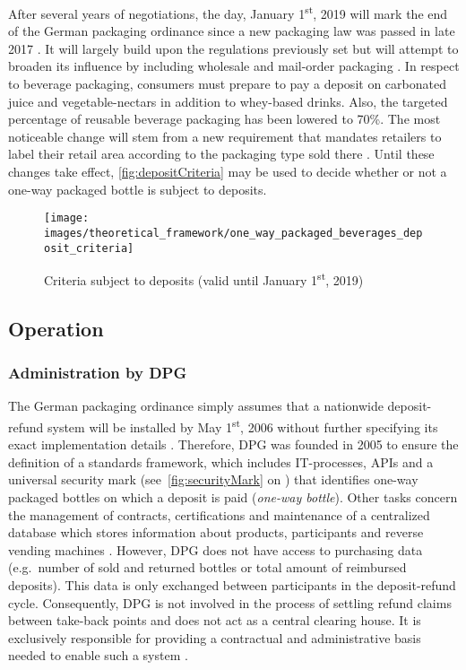 After several years of negotiations, the day, January 1\textsuperscript{st}, 2019 will mark the end of the German packaging ordinance since a new packaging law was passed in late 2017 \cite[p.~4]{verpackG}. It will largely build upon the regulations previously set but will attempt to broaden its influence by including wholesale and mail-order packaging \cite[p.~6]{verpackG}. In respect to beverage packaging, consumers must prepare to pay a deposit on carbonated juice and vegetable-nectars in addition to whey-based drinks. Also, the targeted percentage of reusable beverage packaging has been lowered to 70\%. The most noticeable change will stem from a new requirement that mandates retailers to label their retail area according to the packaging type sold there \cite[p.~9]{verpackG}. Until these changes take effect, \autoref{fig:depositCriteria} may be used to decide whether or not a one-way packaged bottle is subject to deposits.

\begin{figure}[hbt]
	\centering
	\texttt{[image: images/theoretical\_framework/one\_way\_packaged\_beverages\_deposit\_criteria]}
	\caption[Criteria subject to deposits]{Criteria subject to deposits (valid until January 1\textsuperscript{st}, 2019) \cite[p.~9]{Hartlep2011Recycling}}
	\label{fig:depositCriteria}
\end{figure}

\FloatBarrier

\subsection{Operation}

\subsubsection{Administration by \acl{DPG}}
\label{sec:DPGAdministration}
The German packaging ordinance simply assumes that a nationwide deposit-refund system will be installed by May 1\textsuperscript{st}, 2006 without further specifying its exact implementation details \cite[Art.~2]{verpackV2005} \cite[§~9]{verpackV2008}. Therefore, \ac{DPG} was founded in 2005 to ensure the definition of a standards framework, which includes IT-processes, \acsp{API} and a universal security mark (see~\autoref{fig:securityMark} on ) that identifies one-way packaged bottles on which a deposit is paid (\textit{one-way bottle}). Other tasks concern the management of contracts, certifications and maintenance of a centralized database which stores information about products, participants and reverse vending machines \cite[pp.~13]{Hartlep2011Recycling}. However, \ac{DPG} does not have access to purchasing data (e.g.~number of sold and returned bottles or total amount of reimbursed deposits). This data is only exchanged between participants in the deposit-refund cycle. Consequently, \ac{DPG} is not involved in the process of settling refund claims between take-back points and does not act as a central clearing house. It is exclusively responsible for providing a contractual and administrative basis needed to enable such a system \cite[p.~14]{Hartlep2011Recycling}.

